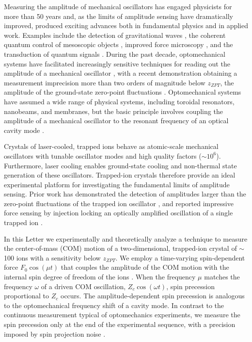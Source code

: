 \documentclass[aps,prl,twocolumn,superscriptaddress,floatfix]{revtex4-1}
\begin{document}
Measuring the amplitude of mechanical oscillators has engaged physicists for more than 50 years \citep{Weber1966, Caves1980} and, as the limits of amplitude sensing have dramatically improved, produced exciting advances both in fundamental physics and in applied work. Examples include the detection of gravitational waves \citep{Abbott2016}, the coherent quantum control of mesoscopic objects \citep{Aspelmeyer2014}, improved force microscopy \citep{Butt2005}, and the transduction of quantum signals \citep{Palomaki2013}. During the past decade, optomechanical systems have facilitated increasingly sensitive techniques for reading out the amplitude of a mechanical oscillator \citep{Teufel2009, Anetsberger2010, Westphal2012, Schreppler2014a, Kampel2016}, with a recent demonstration obtaining a measurement imprecision more than two orders of magnitude below $z_{ZPT}$, the amplitude of the ground-state zero-point fluctuations \citep{Wilson2014a}. Optomechanical systems have assumed a wide range of physical systems, including toroidal resonators, nanobeams, and membranes, but the basic principle involves coupling the amplitude of a mechanical oscillator to the resonant frequency of an optical cavity mode \citep{Aspelmeyer2014}.

Crystals of laser-cooled, trapped ions behave as atomic-scale mechanical oscillators \citep{Jost2009,Biercuk2010,Sawyer2012} with tunable oscillator modes and high quality factors ($ {\sim} 10^6$). Furthermore, laser cooling enables ground-state cooling and non-thermal state generation of these oscillators. Trapped-ion crystals therefore provide an ideal experimental platform for investigating the fundamental limits of amplitude sensing. Prior work has demonstrated the detection of amplitudes larger than the zero-point fluctuations of the trapped ion oscillator \citep{Biercuk2010,Sawyer2012,Shaniv2016}, and reported impressive force sensing by injection locking an optically amplified oscillation of a single trapped ion \citep{Knunz2010}.

In this Letter we experimentally and theoretically analyze a technique to measure the center-of-mass (COM) motion of a two-dimensional, trapped-ion crystal of $\sim$100 ions with a sensitivity below $z_{ZPT}$. We employ a time-varying spin-dependent force $F_0\cos\left(\mu t\right)$ that couples the amplitude of the COM motion with the internal spin degree of freedom of the ions \citep{Bollinger2013,Sawyer2014,Ivanov2016}. When the frequency $\mu$ matches the frequency $\omega$ of a driven COM oscillation, $Z_{c}\cos\left(\omega t\right)$, spin precession proportional to $Z_{c}$ occurs. The amplitude-dependent spin precession is analogous to the optomechanical frequency shift of a cavity mode. In contrast to the continuous measurement typical of optomechanics experiments, we measure the spin precession only at the end of the experimental sequence, with a precision imposed by spin projection noise \citep{Itano1993}.
\end{document}
